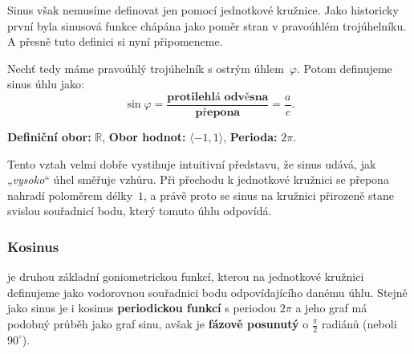 \documentclass[12pt,a4paper]{article}
\begin{document}
Sinus však nemusíme definovat jen pomocí jednotkové kružnice. Jako historicky první byla sinusová funkce chápána jako poměr stran v pravoúhlém trojúhelníku.
A přesně tuto definici si nyní připomeneme.

\begin{definitionbox}
Nechť tedy máme pravoúhlý trojúhelník s ostrým úhlem~$\varphi$. Potom definujeme sinus úhlu jako:
\[
\sin\varphi = 
\frac{\textbf{protilehlá odvěsna}}{\textbf{přepona}}
= \frac{a}{c}.
\]

\textbf{Definiční obor:} $\mathbb{R}$, \qquad
\textbf{Obor hodnot:} $\langle -1,1\rangle$, \qquad
\textbf{Perioda:} $2\pi$.
\end{definitionbox}

Tento vztah velmi dobře vystihuje intuitivní představu, že sinus udává, jak „\emph{vysoko}“ úhel směřuje vzhůru.
Při přechodu k jednotkové kružnici se přepona nahradí poloměrem délky~$1$, a právě proto se sinus na
kružnici přirozeně stane svislou souřadnicí bodu, který tomuto úhlu odpovídá.

\begin{center}
\end{center}


\newpage


\subsubsection*{Kosinus}

 je druhou základní goniometrickou funkcí, kterou na jednotkové kružnici definujeme jako
vodorovnou souřadnici bodu odpovídajícího danému úhlu. 
Stejně jako sinus je i kosinus \textbf{periodickou funkcí} s periodou \textbf{$2\pi$} 
a jeho graf má podobný průběh jako graf sinu, avšak je \textbf{fázově posunutý} o $\frac{\pi}{2}$ radiánů (neboli $90^\circ$).
\end{document}
